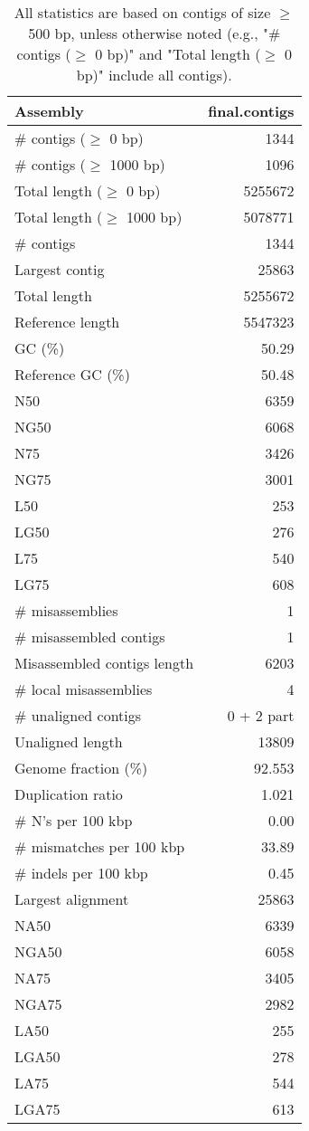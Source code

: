 \documentclass[12pt,a4paper]{article}
\begin{document}
\begin{table}[ht]
\begin{center}
\caption{All statistics are based on contigs of size $\geq$ 500 bp, unless otherwise noted (e.g., "\# contigs ($\geq$ 0 bp)" and "Total length ($\geq$ 0 bp)" include all contigs).}
\begin{tabular}{|l*{1}{|r}|}
\hline
Assembly & final.contigs \\ \hline
\# contigs ($\geq$ 0 bp) & 1344 \\ \hline
\# contigs ($\geq$ 1000 bp) & 1096 \\ \hline
Total length ($\geq$ 0 bp) & 5255672 \\ \hline
Total length ($\geq$ 1000 bp) & 5078771 \\ \hline
\# contigs & 1344 \\ \hline
Largest contig & 25863 \\ \hline
Total length & 5255672 \\ \hline
Reference length & 5547323 \\ \hline
GC (\%) & 50.29 \\ \hline
Reference GC (\%) & 50.48 \\ \hline
N50 & 6359 \\ \hline
NG50 & 6068 \\ \hline
N75 & 3426 \\ \hline
NG75 & 3001 \\ \hline
L50 & 253 \\ \hline
LG50 & 276 \\ \hline
L75 & 540 \\ \hline
LG75 & 608 \\ \hline
\# misassemblies & 1 \\ \hline
\# misassembled contigs & 1 \\ \hline
Misassembled contigs length & 6203 \\ \hline
\# local misassemblies & 4 \\ \hline
\# unaligned contigs & 0 + 2 part \\ \hline
Unaligned length & 13809 \\ \hline
Genome fraction (\%) & 92.553 \\ \hline
Duplication ratio & 1.021 \\ \hline
\# N's per 100 kbp & 0.00 \\ \hline
\# mismatches per 100 kbp & 33.89 \\ \hline
\# indels per 100 kbp & 0.45 \\ \hline
Largest alignment & 25863 \\ \hline
NA50 & 6339 \\ \hline
NGA50 & 6058 \\ \hline
NA75 & 3405 \\ \hline
NGA75 & 2982 \\ \hline
LA50 & 255 \\ \hline
LGA50 & 278 \\ \hline
LA75 & 544 \\ \hline
LGA75 & 613 \\ \hline
\end{tabular}
\end{center}
\end{table}
\end{document}
